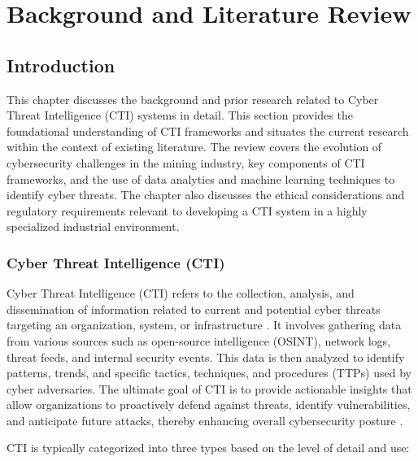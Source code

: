 \documentclass[a4paper,twoside,12pt]{report}
\begin{document}
\chapter{Background and Literature Review}

\section{Introduction}
This chapter discusses the background and prior research related to Cyber Threat Intelligence (CTI) systems in detail. This section provides the foundational understanding of CTI frameworks and situates the current research within the context of existing literature. The review covers the evolution of cybersecurity challenges in the mining industry, key components of CTI frameworks, and the use of data analytics and machine learning techniques to identify cyber threats. The chapter also discusses the ethical considerations and regulatory requirements relevant to developing a CTI system in a highly specialized industrial environment.

\subsection{Cyber Threat Intelligence (CTI)}

Cyber Threat Intelligence (CTI) refers to the collection, analysis, and dissemination of information related to current and potential cyber threats targeting an organization, system, or infrastructure \citet{kotsias2023adopting}. It involves gathering data from various sources such as open-source intelligence (OSINT), network logs, threat feeds, and internal security events. This data is then analyzed to identify patterns, trends, and specific tactics, techniques, and procedures (TTPs) used by cyber adversaries. The ultimate goal of CTI is to provide actionable insights that allow organizations to proactively defend against threats, identify vulnerabilities, and anticipate future attacks, thereby enhancing overall cybersecurity posture \citet{webb2014information}.

CTI is typically categorized into three types based on the level of detail and use:
\end{document}
